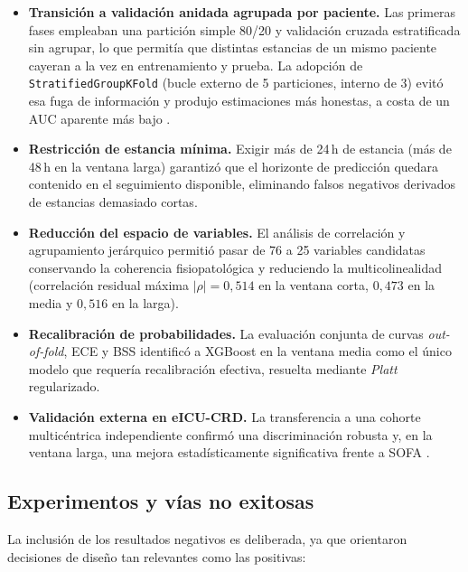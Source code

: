\documentclass[
  spanish,
  a4paper,
  12pt,
  twoside]{memoir}
\begin{document}
\begin{itemize}
  \item \textbf{Transición a validación anidada agrupada por paciente.} Las primeras fases empleaban una partición simple 80/20 y validación cruzada
  estratificada sin agrupar, lo que permitía que distintas estancias de un mismo paciente cayeran a la vez en entrenamiento y prueba. La adopción de
  \texttt{StratifiedGroupKFold} (bucle externo de 5 particiones, interno de 3) evitó esa fuga de información y produjo estimaciones más honestas, a costa de
  un AUC aparente más bajo \cite{kamran2024}.

  \item \textbf{Restricción de estancia mínima.} Exigir más de 24\,h de estancia (más de 48\,h en la ventana larga) garantizó que el horizonte de
  predicción quedara contenido en el seguimiento disponible, eliminando falsos negativos derivados de estancias demasiado cortas.

  \item \textbf{Reducción del espacio de variables.} El análisis de correlación y agrupamiento jerárquico permitió pasar de 76 a 25 variables
  candidatas conservando la coherencia fisiopatológica y reduciendo la multicolinealidad (correlación residual máxima $|\rho| = 0{,}514$ en la
  ventana corta, $0{,}473$ en la media y $0{,}516$ en la larga).

  \item \textbf{Recalibración de probabilidades.} La evaluación conjunta de curvas \textit{out-of-fold}, ECE y BSS identificó a XGBoost en la ventana
  media como el único modelo que requería recalibración efectiva, resuelta mediante \emph{Platt} regularizado.

  \item \textbf{Validación externa en eICU-CRD.} La transferencia a una cohorte multicéntrica independiente confirmó una discriminación robusta y, en la ventana larga, una mejora estadísticamente
   significativa frente a SOFA \cite{pollard2018,rockenschaub2025}.
\end{itemize}

\subsection*{Experimentos y vías no exitosas}

La inclusión de los resultados negativos es deliberada, ya que orientaron
decisiones de diseño tan relevantes como las positivas:
\end{document}
